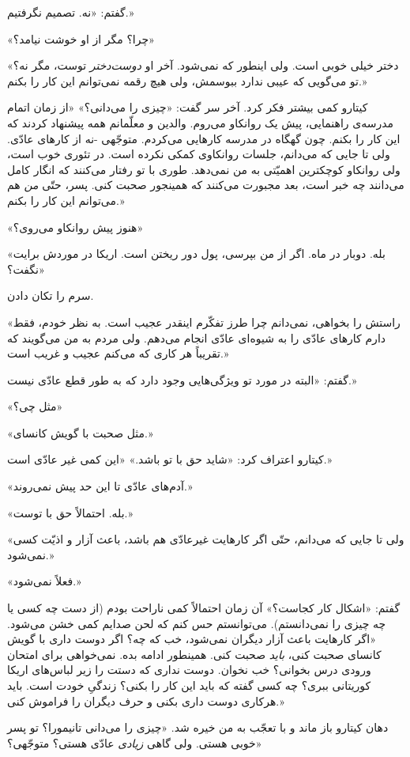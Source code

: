 \documentclass[a5paper]{book}
\begin{document}
گفتم: «نه. تصمیم نگرفتیم.»

«چرا؟ مگر از او خوشت نیامد؟»

«دختر خیلی خوبی است. ولی اینطور که نمی‌شود. آخر او \emph{دوست‌دختر} توست، مگر نه؟ تو می‌گویی که عیبی ندارد ببوسمش، ولی هیچ رقمه نمی‌توانم این کار را بکنم.»

کیتارو کمی بیشتر فکر کرد. آخر سر گفت: «چیزی را می‌دانی؟» «از زمان اتمام مدرسه‌ی راهنمایی، پیش یک روانکاو می‌روم. والدین و معلّمانم همه پیشنهاد کردند که این کار را بکنم. چون گهگاه در مدرسه کارهایی می‌کردم. متوجّهی -نه از کارهای عادّی. ولی تا جایی که می‌دانم، جلسات روانکاوی کمکی نکرده است. در تئوری خوب است، ولی روانکاو کوچکترین اهمیّتی به من نمی‌دهد. طوری با تو رفتار می‌کنند که انگار کامل می‌دانند چه خبر است، بعد مجبورت می‌کنند که همینجور صحبت کنی. پسر، حتّی \emph{من} هم می‌توانم این کار را بکنم.»

«هنوز پیش روانکاو می‌روی؟»

«بله. دوبار در ماه. اگر از من بپرسی، پول دور ریختن است. اریکا در موردش برایت نگفت؟»

سرم را تکان دادن.

«راستش را بخواهی، نمی‌دانم چرا طرز تفکّرم اینقدر عجیب است. به نظر خودم، فقط دارم کارهای عادّی را به شیوه‌ای عادّی انجام می‌دهم. ولی مردم به من می‌گویند که تقریباً هر کاری که می‌کنم عجیب و غریب است.»

گفتم: «البته در مورد تو ویژگی‌هایی وجود دارد که به طور قطع عادّی نیست.»

«مثل چی؟»

«مثل صحبت با گویش کانسای.»

کیتارو اعتراف کرد: «شاید حق با تو باشد.» «این کمی غیر عادّی است.»

«آدم‌های عادّی تا این حد پیش نمی‌روند.»

«بله. احتمالاً حق با توست.»

«ولی تا جایی که می‌دانم، حتّی اگر کارهایت غیرعادّی هم باشد، باعث آزار و اذیّت کسی نمی‌شود.»

«فعلاً نمی‌شود.»

گفتم: «اشکال کار کجاست؟» آن زمان احتمالاً کمی ناراحت بودم (از دست چه کسی یا چه چیزی را نمی‌دانستم). می‌توانستم حس کنم که لحن صدایم کمی خشن می‌شود. «اگر کارهایت باعث آزار دیگران نمی‌شود، خب که چه؟ اگر دوست داری با گویش کانسای صحبت کنی، \emph{باید} صحبت کنی. همینطور ادامه بده. نمی‌خواهی برای امتحان ورودی درس بخوانی؟ خب نخوان. دوست نداری که دستت را زیر لباس‌های اریکا کوریتانی ببری؟ چه کسی گفته که باید این کار را بکنی؟ زندگیِ خودت است. باید هرکاری دوست داری بکنی و حرف دیگران را فراموش کنی.»

دهان کیتارو باز ماند و با تعجّب به من خیره شد. «چیزی را می‌دانی تانیمورا؟ تو پسر خوبی هستی. ولی گاهی \emph{زیادی} عادّی هستی؟ متوجّهی؟»
\end{document}
